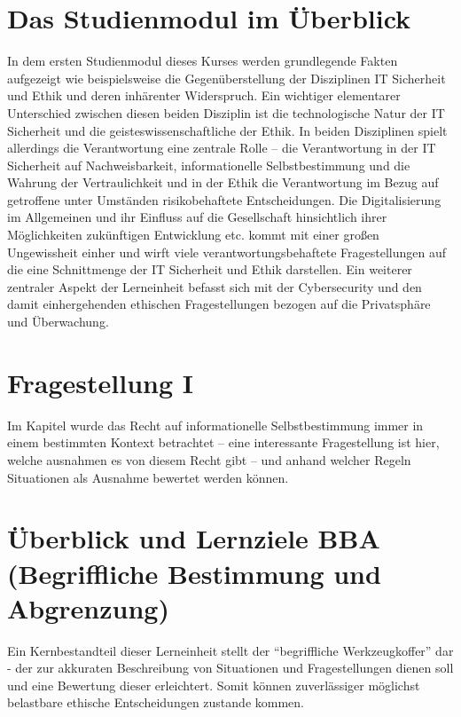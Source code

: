 \documentclass[journal]{IEEEtran}
\begin{document}

\begin{onecolumn}

\section{Das Studienmodul im Überblick}

In dem ersten Studienmodul dieses Kurses werden grundlegende Fakten aufgezeigt wie beispielsweise
die Gegenüberstellung der Disziplinen IT Sicherheit und Ethik und deren inhärenter Widerspruch.
Ein wichtiger elementarer Unterschied zwischen diesen beiden Disziplin ist die technologische Natur
der IT Sicherheit und die geisteswissenschaftliche der Ethik. In beiden Disziplinen spielt allerdings
die Verantwortung eine zentrale Rolle – die Verantwortung in der IT Sicherheit auf Nachweisbarkeit, 
informationelle Selbstbestimmung und die Wahrung der Vertraulichkeit und in der Ethik die Verantwortung
im Bezug auf getroffene unter Umständen risikobehaftete Entscheidungen. 
Die Digitalisierung im Allgemeinen und ihr Einfluss auf die Gesellschaft hinsichtlich ihrer Möglichkeiten
zukünftigen Entwicklung etc. kommt mit einer großen Ungewissheit einher und wirft viele 
verantwortungsbehaftete Fragestellungen auf die eine Schnittmenge der IT Sicherheit und Ethik darstellen. 
Ein weiterer zentraler Aspekt der Lerneinheit befasst sich mit der Cybersecurity und den damit 
einhergehenden ethischen Fragestellungen bezogen auf die Privatsphäre und Überwachung.

\section*{Fragestellung I}

Im Kapitel wurde das Recht auf informationelle Selbstbestimmung immer in einem bestimmten Kontext 
betrachtet – eine interessante Fragestellung ist hier, welche ausnahmen es von diesem Recht gibt – und 
anhand welcher Regeln Situationen als Ausnahme bewertet werden können.

\section{Überblick und Lernziele BBA (Begriffliche Bestimmung und Abgrenzung)}

Ein Kernbestandteil dieser Lerneinheit stellt der ``begriffliche Werkzeugkoffer'' dar - der zur akkuraten 
Beschreibung von Situationen und Fragestellungen dienen soll und eine Bewertung dieser erleichtert.
Somit können zuverlässiger möglichst belastbare ethische Entscheidungen zustande kommen.


\end{onecolumn}
\end{document}
